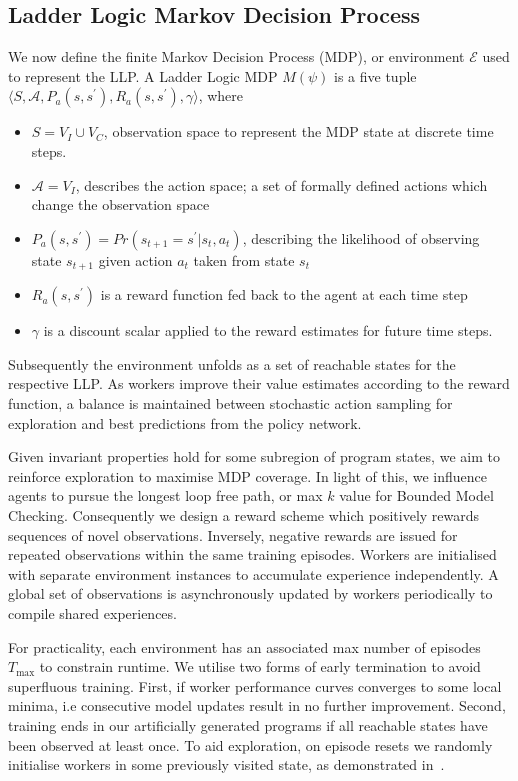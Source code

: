 \documentclass[conference,compsoc]{IEEEtran}
\begin{document}
\subsection{Ladder Logic Markov Decision Process}\label{subsect:MDP}
We now define the finite Markov Decision Process (MDP), or environment $\mathcal{E}$ used to represent the LLP. A Ladder Logic MDP $M(\psi)$ is a five tuple $\langle S,\mathcal{A},P_a(s,s^\prime), R_a(s,s^\prime),\gamma \rangle$, where 
\begin{itemize}
	\item $S = V_I \cup V_C$, observation space to represent the MDP state at discrete time steps.
	\item $\mathcal{A} = V_I$, describes the action space; a set of formally defined actions which change the observation space
	\item $P_a(s,s^\prime) = Pr(s_{t+1} = s^\prime | s_t, a_t)$, describing the likelihood of observing state $s_{t+1}$ given action $a_t$ taken from state $s_t$
	\item $R_a(s,s^\prime)$ is a reward function fed back to the agent at each time step
	\item $\gamma$ is a discount scalar applied to the reward estimates for future time steps.
\end{itemize}

Subsequently the environment unfolds as a set of reachable states for the respective LLP. As workers improve their value estimates according to the reward function, a balance is maintained between stochastic action sampling for exploration and best predictions from the policy network.

Given invariant properties hold for some subregion of program states, we aim to reinforce exploration to maximise MDP coverage. In light of this, we influence agents to pursue the longest loop free path, or max $k$ value for Bounded Model Checking. Consequently we design a reward scheme which positively rewards sequences of novel observations. Inversely, negative rewards are issued for repeated observations within the same training episodes. Workers are initialised with separate environment instances to accumulate experience independently. A global set of observations is asynchronously updated by workers periodically to compile shared experiences.    

For practicality, each environment has an associated max number of episodes $T_{\max}$ to constrain runtime. We utilise two forms of early termination to avoid superfluous training. First, if worker performance curves converges to some local minima, i.e consecutive model updates result in no further improvement. Second, training ends in our artificially generated programs if all reachable states have been observed at least once. To aid exploration, on episode resets we randomly initialise workers in some previously visited state, as demonstrated in~\cite{gordillo2021improving}. 
\end{document}
